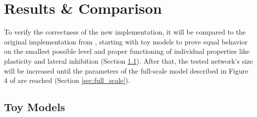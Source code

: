 
\chapter{Results \& Comparison} %

\label{Chapter5} %


To verify the correctness of the new implementation, it will be compared to the original implementation from \parencite{klampfl_maass_2013}, starting with toy models to prove equal behavior on the smallest possible level and proper functioning of individual properties like plasticity and lateral inhibition (Section \ref{sec:toy_models}). After that, the tested network's size will be increased until the parameters of the full-scale model described in Figure 4 of \parencite{klampfl_maass_2013} are reached (Section \ref{sec:full_scale}).

\section{Toy Models} \label{sec:toy_models}
